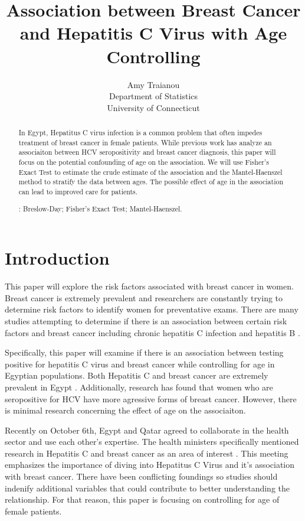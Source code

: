 \documentclass[12pt, titlepage]{article}
\title{Association between Breast Cancer and Hepatitis C Virus with Age Controlling}
\author{Amy Traianou\\
  Department of Statistics\\
  University of Connecticut
}
\begin{document}
\maketitle


\begin{abstract}
In Egypt, Hepatitus C virus infection is a common problem that often impedes treatment
of breast cancer in female patients. While previous work has analyze an associaiton 
between HCV seropositivity and breast cancer diagnosis, this paper will focus on the 
potential confounding of age on the association. We will use Fisher's Exact Test to
estimate the crude estimate of the association and the Mantel-Haenszel method to 
stratify the data between ages. The possible effect of age in the association can
lead to improved care for patients. 


\bigskip
{}:
Breslow-Day;
Fisher's Exact Test;
Mantel-Haenszel.
\end{abstract}


\section{Introduction}
\label{sec:intro}

This paper will explore the risk factors associated with breast 
cancer in women. Breast cancer is extremely prevalent and researchers 
are constantly trying to determine risk factors to identify women for preventative exams.
There are many studies attempting to determine if there is an association 
between certain risk factors and breast cancer including chronic hepatitis 
C infection \citep{Larrey2010is} and hepatitis B \citep{vishnu2016does}. 

Specifically, this paper will examine if there is an association between 
testing positive for hepatitis C virus and breast cancer while controlling 
for age in Egyptian populations. Both Hepatitis C and breast 
cancer are extremely prevalent in Egypt \citep{Hussein2021high}.
Additionally, research has found that women who are seropositive for 
HCV have more agressive forms of breast cancer. However, there is 
minimal research concerning the effect of age on the associaiton. 

Recently on October 6th, Egypt and Qatar agreed to collaborate in the health sector and 
use each other's expertise. The health ministers specifically mentioned research 
in Hepatitis C and breast cancer as an area of interest \citep{arham2022egypt}. 
This meeting emphasizes the importance of diving into Hepatitus C Virus 
and it's association with breast cancer. There have been conflicting
foundings so studies should indenify additional variables that could 
contribute to better understanding the relationship. For that reason,
this paper is focusing on controlling for age of female patients. 
\end{document}
